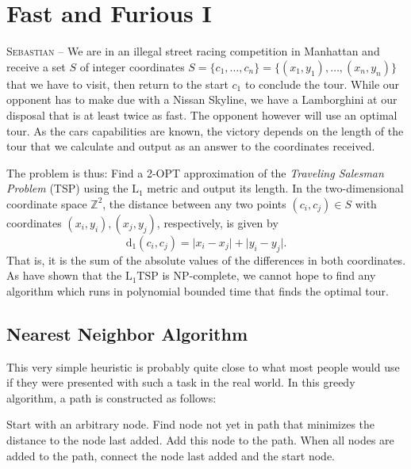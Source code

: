 \documentclass[a4paper,12pt,headsepline]{scrartcl}
\begin{document}
\section{Fast and Furious \textrm{I}} \label{sec:FFI}
    \textsc{Sebastian --} %
    We are in an illegal street racing competition in Manhattan and receive a set $S$ of integer coordinates $S = \{c_1, \ldots, c_n \} = \{(x_1, y_1), \ldots, (x_n, y_n)\}$ that we have to visit, then return to the start $c_1$ to conclude the tour.
    While our opponent has to make due with a Nissan Skyline, we have a Lamborghini at our disposal that is at least twice as fast.
    The opponent however will use an optimal tour.
    As the cars capabilities are known, the victory depends on the length of the tour that we calculate and output as an answer to the coordinates received.

    The problem is thus: Find a 2-OPT approximation of the \textit{Traveling Salesman Problem} (TSP) using the $\operatorname{L_1}$ metric and output its length.
    In the two-dimensional coordinate space $\mathbb{Z}^{2}$, the distance between any two points $(c_i, c_j) \in S$ with coordinates $(x_i, y_i), (x_j, y_j)$, respectively, is given by 
    \begin{equation}
    \operatorname{d_1}(c_i,c_j) = \lvert x_i - x_j \rvert + \lvert y_i - y_j \rvert.
    \label{eq:d1}
    \end{equation}
    That is, it is the sum of the absolute values of the differences in both coordinates.
    As \citet{np-compl_geo} have shown that the $\operatorname{L_1 TSP}$ is NP-complete, we cannot hope to find any algorithm which runs in polynomial bounded time that finds the optimal tour.

    \subsection{Nearest Neighbor Algorithm}\label{sec:FFI_NN}
    This very simple heuristic is probably quite close to what most people would use if they were presented with such a task in the real world.
    In this greedy algorithm, a path is constructed as follows:

    \begin{algorithm}
        \caption{Nearest Neighbor}
        \begin{algorithmic}[1]
            \State Start with an arbitrary node.
            \State Find node not yet in path that minimizes the distance to the node last added. Add this node to the path.
            \State When all nodes are added to the path, connect the node last added and the start node.
        \end{algorithmic}
        \label{alg:NN}
    \end{algorithm}
\end{document}
